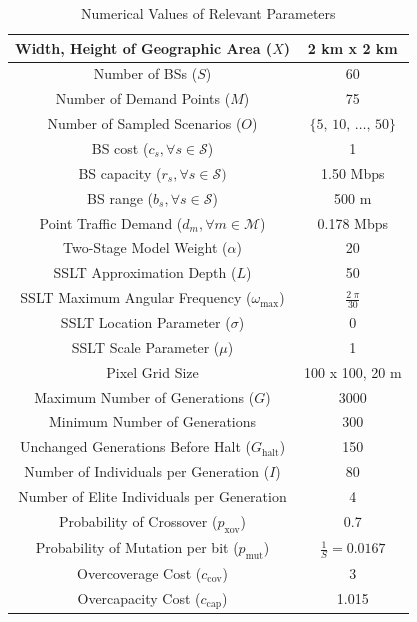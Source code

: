 \documentclass[12pt,dvipsnames]{report}
\begin{document}
\begin{table}
\vspace{0.25in}
\centering
\caption{Numerical Values of Relevant Parameters}
\begin{tabular}{|c|c|} 
\hline
Width, Height of Geographic Area ($X$) & 2 km x 2 km \\
\hline
Number of BSs ($S$) & 60 \\ 
\hline 
Number of Demand Points ($M$) & 75 \\ 
\hline 
Number of Sampled Scenarios ($O$) & $\{5,\, 10,\, \ldots,\, 50\}$ \\ 
\hline 
BS cost ($c_s, \forall s \in \mathcal{S}$) & 1 \\ 
\hline 
BS capacity ($r_s, \forall s \in \mathcal{S})$ & 1.50 Mbps \\ 
\hline
BS range ($b_s, \forall s \in \mathcal{S}$) & 500 m \\
\hline 
Point Traffic Demand ($d_m, \forall m \in \mathcal{M}$) & 0.178 Mbps \\ 
\hline 
Two-Stage Model Weight ($\alpha$) & 20\\ 
\hline 
\hline
SSLT Approximation Depth ($L$) & 50 \\ 
\hline
SSLT Maximum Angular Frequency ($\omega_{\max}$) & $\frac{2 \; \pi}{30}$ \\
\hline 
SSLT Location Parameter ($\sigma$) & 0 \\ 
\hline 
SSLT Scale Parameter ($\mu$) & 1 \\ 
\hline
Pixel Grid Size & 100 x 100, 20 m \\
\hline 
\hline
Maximum Number of Generations ($G$) & 3000 \\ 
\hline
Minimum Number of Generations & 300 \\
\hline
Unchanged Generations Before Halt ($G_\text{halt}$) & 150 \\
\hline 
Number of Individuals per Generation ($I$) & 80 \\ 
\hline
Number of Elite Individuals per Generation & 4 \\
\hline 
Probability of Crossover ($p_\text{xov}$) & 0.7 \\ 
\hline
Probability of Mutation per bit ($p_\text{mut}$) & $\frac{1}{S} = 0.0167$ \\
\hline 
Overcoverage Cost ($c_\text{cov}$) & 3 \\
\hline
Overcapacity Cost ($c_\text{cap}$) & 1.015 \\
\hline
\end{tabular}
\label{tab:simval}
\end{table}
\end{document}
